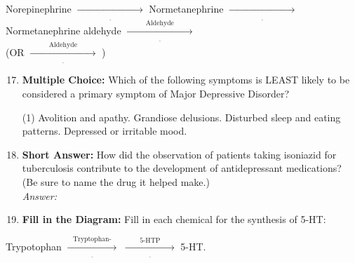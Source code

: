 \vspace*{-0.5cm}
    Norepinephrine \(\xrightarrow[\underline{\hspace{4cm}}]{}\) Normetanephrine \(\xrightarrow[\underline{\hspace{4cm}}]{}\) \\
    Normetanephrine aldehyde \(\xrightarrow[\underline{\hspace{4cm}}]{\text{Aldehyde}}\) \underline{\hspace{4cm}} \\
    \phantom{Normetanephrine aldel}(OR \(\xrightarrow[\underline{\hspace{4cm}}]{\text{Aldehyde}}\) \underline{\hspace{4cm}})
\newpage
\begin{enumerate}[label = \textbf{Q4.2.\arabic*}]
    \setcounter{enumi}{16}
    \item \textbf{Multiple Choice:} Which of the following symptoms is LEAST likely to be considered a primary symptom of Major Depressive Disorder?
    \begin{tasks}[label=\textcolor{\documentTheme}{(\Alph*)}, item-format=\color{\documentTheme}, label-width=1.5em, item-indent=1.7em](1)
        \task Avolition and apathy.
        \task Grandiose delusions.
        \task Disturbed sleep and eating patterns.
        \task Depressed or irritable mood.
    \end{tasks}

    \item \textbf{Short Answer:} How did the observation of patients taking isoniazid for tuberculosis contribute to the development of antidepressant medications? (Be sure to name the drug it helped make.) \\
        \textit{Answer:} \\ %

    \item \textbf{Fill in the Diagram:} Fill in each chemical for the synthesis of 5-HT: \\
\end{enumerate}
\vspace*{-0.5cm}
    \noindent Trypotophan \(\xrightarrow[\underline{\hspace{3cm}}]{\text{Tryptophan-}}\) \underline{\hspace{3cm}} \(\xrightarrow[\underline{\hspace{3cm}}]{\text{5-HTP}}\) 5-HT.
